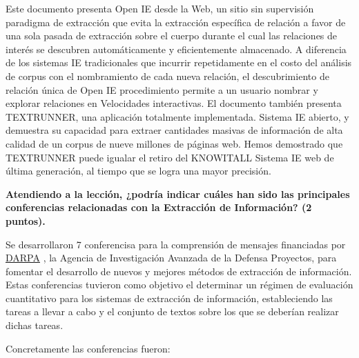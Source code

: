 \documentclass[11pt]{exam}
\begin{document}
\begin{questions}
Este documento presenta Open IE desde la Web, un sitio sin supervisión
paradigma de extracción que evita la extracción específica de relación
a favor de una sola pasada de extracción sobre el cuerpo
durante el cual las relaciones de interés se descubren automáticamente
y eficientemente almacenado. A diferencia de los sistemas IE tradicionales que
incurrir repetidamente en el costo del análisis de corpus con el nombramiento
de cada nueva relación, el descubrimiento de relación única de Open IE
procedimiento permite a un usuario nombrar y explorar relaciones en
Velocidades interactivas.
El documento también presenta TEXTRUNNER, una aplicación totalmente implementada.
Sistema IE abierto, y demuestra su capacidad para
extraer cantidades masivas de información de alta calidad de
un corpus de nueve millones de páginas web. Hemos demostrado que
TEXTRUNNER puede igualar el retiro del KNOWITALL
Sistema IE web de última generación, al tiempo que se logra una mayor precisión.

{\bf \question Atendiendo a la lección, ¿podría indicar cuáles han sido las principales conferencias relacionadas con la Extracción de Información? (2 puntos).}

Se desarrollaron 7 conferencisa para la comprensión de mensajes financiadas por \href{https://es.qwe.wiki/wiki/DARPA}{DARPA} , la Agencia de Investigación Avanzada de la Defensa Proyectos, para fomentar el desarrollo de nuevos y mejores métodos de extracción de información. Estas conferencias tuvieron como objetivo el determinar un régimen de evaluación cuantitativo para los sistemas de extracción de información, estableciendo las tareas a llevar a cabo y el conjunto de textos sobre los que se deberían realizar dichas tareas.

Concretamente las conferencias fueron:


\end{questions}
\end{document}
